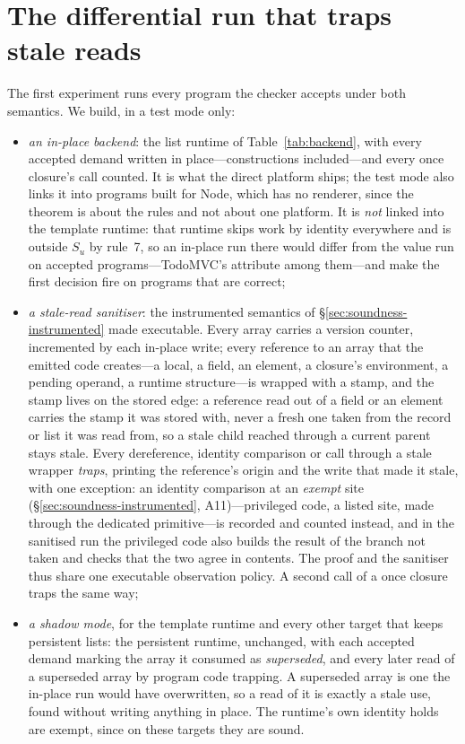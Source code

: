 \section{The differential run that traps stale reads}
\label{sec:eval-sanitiser}

The first experiment runs every program the checker accepts under both semantics. We build, in a test
mode only:
\begin{itemize}
\item \emph{an in-place backend}: the list runtime of Table~\ref{tab:backend}, with every accepted demand
written in place---constructions included---and every once closure's call counted. It is what the direct
platform ships; the test mode also links it into programs built for Node, which has no renderer, since the
theorem is about the rules and not about one platform. It is \emph{not} linked into the template runtime:
that runtime skips work by identity everywhere and is outside $S_u$ by rule~7, so an in-place run there
would differ from the value run on accepted programs---TodoMVC's  attribute among them---and
make the first decision fire on programs that are correct;
\item \emph{a stale-read sanitiser}: the instrumented semantics of \S\ref{sec:soundness-instrumented}
made executable. Every array carries a version counter, incremented by each in-place write; every
reference to an array that the emitted code creates---a local, a field, an element, a closure's
environment, a pending operand, a runtime structure---is wrapped with a stamp, and the stamp lives on the
stored edge: a reference read out of a field or an element carries the stamp it was stored with, never a
fresh one taken from the record or list it was read from, so a stale child reached through a current
parent stays stale. Every dereference, identity comparison or call through a stale wrapper \emph{traps},
printing the reference's origin and the write that made it stale, with one exception: an identity
comparison at an \emph{exempt} site (\S\ref{sec:soundness-instrumented}, A11)---privileged code, a listed
site, made through the dedicated primitive---is recorded and counted instead, and in the sanitised run
the privileged code also builds the result of the branch not taken and checks that the two agree in
contents. The proof and the sanitiser thus share one executable observation
policy. A second call of a once closure traps the same way;
\item \emph{a shadow mode}, for the template runtime and every other target that keeps persistent lists:
the persistent runtime, unchanged, with each accepted demand marking the array it consumed as
\emph{superseded}, and every later read of a superseded array by program code trapping. A superseded array
is one the in-place run would have overwritten, so a read of it is exactly a stale use, found without
writing anything in place. The runtime's own identity holds are exempt, since on these targets they are
sound.
\end{itemize}
